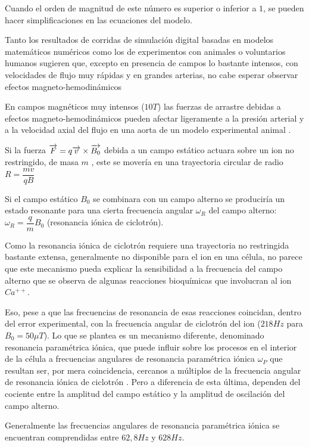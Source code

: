 Cuando el orden de magnitud de este número es superior o inferior a $1$, se pueden hacer simplificaciones en las ecuaciones del modelo.

Tanto los resultados de corridas de simulación digital basadas en modelos matemáticos numéricos como los de experimentos con animales o voluntarios humanos sugieren que, excepto en presencia de campos lo bastante intensos, con velocidades de flujo muy rápidas y en grandes arterias, no cabe esperar observar efectos magneto-hemodinámicos \citep{Kyriakou_2012}\citep{Martin_2012}

En campos magnéticos muy intensos ($10 T$) las fuerzas de arrastre debidas a efectos magneto-hemodinámicos pueden afectar ligeramente a la presión arterial y a la velocidad axial del flujo en una aorta de un modelo experimental animal \citep{Markov_2015}.

Si la fuerza $\overrightarrow{F}=q\overrightarrow{v}\times\overrightarrow{B_{0}}$ debida a un campo estático actuara sobre un ion no restringido, de masa $m$ , este se movería en una trayectoria circular de radio ${R=\dfrac{mv}{qB}}$

Si el campo estático $B_{0}$ se combinara con un campo alterno se produciría un estado resonante para una cierta frecuencia angular $\omega_{R}$ del campo alterno: $\omega_{R}=\dfrac{q}{m}B_{0}$ (resonancia iónica de ciclotrón).

Como la resonancia iónica de ciclotrón requiere una trayectoria no restringida bastante extensa, generalmente no disponible para el ion en una célula, no parece que este mecanismo pueda explicar la sensibilidad a la frecuencia del campo alterno que se observa de algunas reacciones bioquímicas que involucran al ion $Ca^{++}$.

Eso, pese a que las frecuencias de resonancia de esas reacciones coincidan, dentro del error experimental, con la frecuencia angular de ciclotrón del ion ($218 Hz$ para $B_{0}=50 \mu T$).
Lo que se plantea es un mecanismo diferente, denominado resonancia paramétrica iónica, que puede influir sobre los procesos en el interior de la célula a frecuencias angulares de resonancia paramétrica iónica $\omega_{P}$ que resultan ser, por mera coincidencia, cercanos a múltiplos de la frecuencia angular de resonancia iónica de ciclotrón \citep{Polk_2006}.
Pero a diferencia de esta última, dependen del cociente entre la amplitud del campo estático y la amplitud de oscilación del campo alterno.

Generalmente las frecuencias angulares de resonancia paramétrica iónica se encuentran comprendidas entre $62,8 Hz$ y $628 Hz$.

